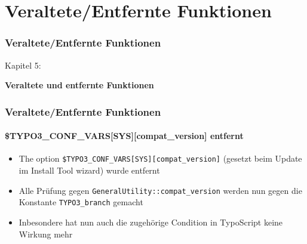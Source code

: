 %

\section{Veraltete/Entfernte Funktionen}
\begin{frame}[fragile]
	\frametitle{Veraltete/Entfernte Funktionen}

	\begin{center}\huge{Kapitel 5:}\end{center}
	\begin{center}\huge{\color{typo3darkgrey}\textbf{Veraltete und entfernte Funktionen}}\end{center}

\end{frame}


\begin{frame}[fragile]
	\frametitle{Veraltete/Entfernte Funktionen}
	\framesubtitle{\$TYPO3\_CONF\_VARS[SYS][compat\_version] entfernt}

	\begin{itemize}

		\item The option \texttt{\$TYPO3\_CONF\_VARS[SYS][compat\_version]} (gesetzt beim Update im Install Tool wizard) wurde entfernt

		\item Alle Prüfung gegen \texttt{GeneralUtility::compat\_version} werden nun gegen die Konstante \texttt{TYPO3\_branch} gemacht

		\item Inbesondere hat nun auch die zugehörige Condition in TypoScript keine Wirkung mehr

	\end{itemize}

\end{frame}

